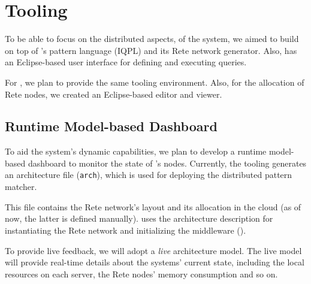 \section{Tooling}
\label{tooling}   

To be able to focus on the distributed aspects, of the system, we aimed to build \iqd{} on top of \eiq{}'s pattern language (IQPL) and its Rete network generator. Also, \eiq{} has an Eclipse-based user interface for defining and executing queries.

For \iqd{}, we plan to provide the same tooling environment. Also, for the allocation of Rete nodes, we created an Eclipse-based editor and viewer.







\subsection{Runtime Model-based Dashboard}
\label{dashboard}

To aid the system's dynamic capabilities, we plan to develop a runtime model-based dashboard to monitor the state of \iqd{}'s nodes. Currently, the \iqd{} tooling generates an architecture file (\texttt{arch}), which is used for deploying the distributed pattern matcher.

This file contains the Rete network's layout and its allocation in the cloud (as of now, the latter is defined manually). \iqd{} uses the architecture description for instantiating the Rete network and initializing the middleware ().


To provide live feedback, we will adopt a \emph{live} architecture model. The live model will provide real-time details about the systems' current state, including the local resources on each server, the Rete nodes' memory consumption and so on.
